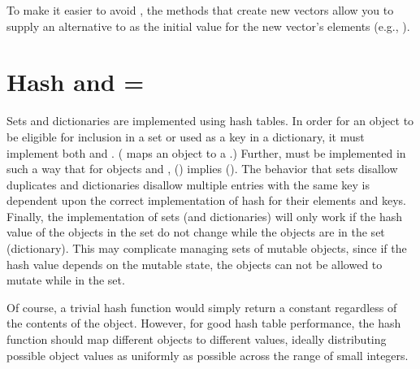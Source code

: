 \documentclass[letterpaper,10pt,english]{sphinxmanual}
\begin{document}
\begin{sphinxVerbatim}[commandchars=\\\{\}]
  
            
           
          
\end{sphinxVerbatim}

To make it easier to avoid , the methods that create new vectors allow you to supply an alternative
to  as the initial value for the new vector’s elements (e.g., ).


\section{Hash and =}
\label{\detokenize{progguid:hash-and}}
Sets and dictionaries are implemented using hash tables. In order for an object to be eligible for inclusion
in a set or used as a key in a dictionary, it must implement both \sphinxcode{=} and . ( maps
an object to a .) Further,  must be implemented in such a way that for objects  and
, () implies (). The behavior that sets disallow duplicates and
dictionaries disallow multiple entries with the same key is dependent upon the correct implementation
of hash for their elements and keys. Finally, the implementation of sets (and dictionaries)
will only work if the hash value of the objects in the set do not change while the objects are in the
set (dictionary). This may complicate managing sets of mutable objects, since if the hash value
depends on the mutable state, the objects can not be allowed to mutate while in the set.

Of course, a trivial hash function would simply return a constant regardless of the contents of the
object. However, for good hash table performance, the hash function should map different objects
to different values, ideally distributing possible object values as uniformly as possible across the
range of small integers.
\end{document}
